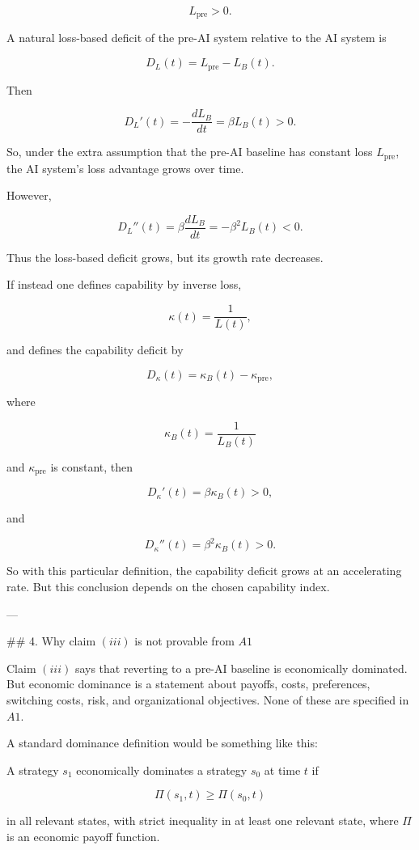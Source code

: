 \[
L_{\mathrm{pre}}>0.
\]

A natural loss-based deficit of the pre-AI system relative to the AI system is

\[
D_L(t)=L_{\mathrm{pre}}-L_B(t).
\]

Then

\[
D_L'(t)
=
-\frac{dL_B}{dt}
=
\beta L_B(t)>0.
\]

So, under the extra assumption that the pre-AI baseline has constant loss $L_{\mathrm{pre}}$, the AI system’s loss advantage grows over time.

However,

\[
D_L''(t)
=
\beta \frac{dL_B}{dt}
=
-\beta^2L_B(t)<0.
\]

Thus the loss-based deficit grows, but its growth rate decreases.

If instead one defines capability by inverse loss,

\[
\kappa(t)=\frac{1}{L(t)},
\]

and defines the capability deficit by

\[
D_\kappa(t)
=
\kappa_B(t)-\kappa_{\mathrm{pre}},
\]

where

\[
\kappa_B(t)=\frac{1}{L_B(t)}
\]

and $\kappa_{\mathrm{pre}}$ is constant, then

\[
D_\kappa'(t)=\beta \kappa_B(t)>0,
\]

and

\[
D_\kappa''(t)=\beta^2\kappa_B(t)>0.
\]

So with this particular definition, the capability deficit grows at an accelerating rate. But this conclusion depends on the chosen capability index.

---

## 4. Why claim $(iii)$ is not provable from $A1$

Claim $(iii)$ says that reverting to a pre-AI baseline is economically dominated. But economic dominance is a statement about payoffs, costs, preferences, switching costs, risk, and organizational objectives. None of these are specified in $A1$.

A standard dominance definition would be something like this:

A strategy $s_1$ economically dominates a strategy $s_0$ at time $t$ if

\[
\Pi(s_1,t)\geq \Pi(s_0,t)
\]

in all relevant states, with strict inequality in at least one relevant state, where $\Pi$ is an economic payoff function.

